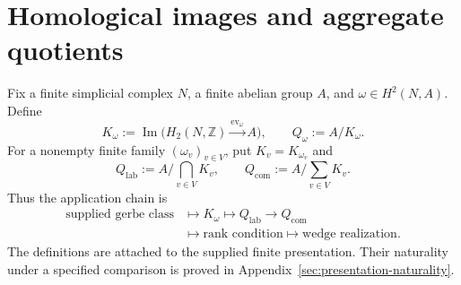 \section{Homological images and aggregate quotients}
\label{sec:homological-images}

Fix a finite simplicial complex \(N\), a finite abelian group \(A\), and
\(\omega\in H^2(N,A)\).  Define
\begin{equation}\label{eq:homological-image-cokernel}
 K_\omega:=\operatorname{Im}\bigl(
 H_2(N,\mathbb Z)\xrightarrow{\operatorname{ev}_\omega}A\bigr),
 \qquad Q_\omega:=A/K_\omega.
\end{equation}
For a nonempty finite family \((\omega_v)_{v\in V}\), put
\(K_v=K_{\omega_v}\) and
\begin{equation}\label{eq:aggregate-quotients}
 Q_{\mathrm{lab}}:=A\Big/\bigcap_{v\in V}K_v,
 \qquad
 Q_{\mathrm{com}}:=A\Big/\sum_{v\in V}K_v.
\end{equation}
Thus the application chain is
\[
\begin{aligned}
 \text{supplied gerbe class}&\longmapsto K_\omega
 \longmapsto Q_{\mathrm{lab}}\longrightarrow Q_{\mathrm{com}}\\
 &\longmapsto\text{rank condition}
 \longmapsto\text{wedge realization}.
\end{aligned}
\]
The definitions are attached to the supplied finite presentation.  Their
naturality under a specified comparison is proved in
Appendix~\ref{sec:presentation-naturality}.

